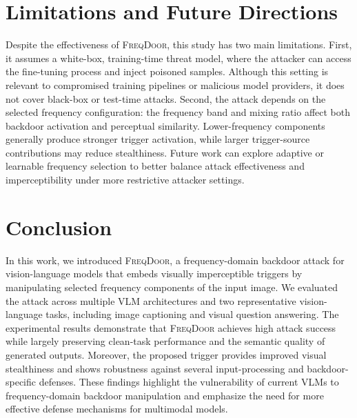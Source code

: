 \documentclass[lettersize,journal]{IEEEtran}
\begin{document}
\FloatBarrier
\section{Limitations and Future Directions}
\label{sec:limitations}

Despite the effectiveness of \textsc{FreqDoor}, this study has two main limitations. First, it assumes a white-box, training-time threat model, where the attacker can access the fine-tuning process and inject poisoned samples. Although this setting is relevant to compromised training pipelines or malicious model providers, it does not cover black-box or test-time attacks. Second, the attack depends on the selected frequency configuration: the frequency band and mixing ratio affect both backdoor activation and perceptual similarity. Lower-frequency components generally produce stronger trigger activation, while larger trigger-source contributions may reduce stealthiness. Future work can explore adaptive or learnable frequency selection to better balance attack effectiveness and imperceptibility under more restrictive attacker settings.


\section{Conclusion}
In this work, we introduced \textsc{FreqDoor}, a frequency-domain backdoor attack for vision-language models that embeds visually imperceptible triggers by manipulating selected frequency components of the input image. We evaluated the attack across multiple VLM architectures and two representative vision-language tasks, including image captioning and visual question answering. The experimental results demonstrate that \textsc{FreqDoor} achieves high attack success while largely preserving clean-task performance and the semantic quality of generated outputs. Moreover, the proposed trigger provides improved visual stealthiness and shows robustness against several input-processing and backdoor-specific defenses. These findings highlight the vulnerability of current VLMs to frequency-domain backdoor manipulation and emphasize the need for more effective defense mechanisms for multimodal models.


% 


\clearpage
\balance


\end{document}
